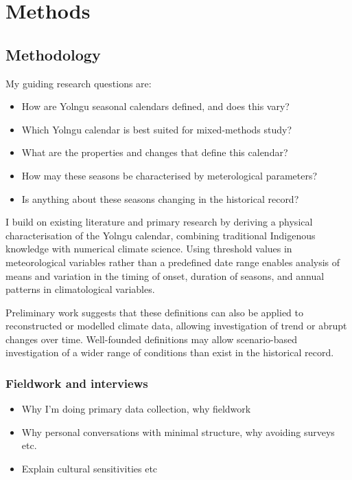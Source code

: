 \chapter{Methods}
\label{ch:methods}

\section{Methodology}

My guiding research questions are:
\begin{itemize}
\item How are Yolngu seasonal calendars defined, and does this vary?
\item Which Yolngu calendar is best suited for mixed-methods study?
\item What are the properties and changes that define this calendar?
\item How may these seasons be characterised by meterological parameters?
\item Is anything about these seasons changing in the historical record?
\end{itemize}

I build on existing literature and primary research by deriving a physical
characterisation of the Yolngu calendar, combining traditional Indigenous
knowledge with numerical climate science. Using threshold values in meteorological
variables rather than a predefined date range enables analysis of means and
variation in the timing of onset, duration of seasons, and annual patterns
in climatological variables.

Preliminary work suggests that these definitions can also be applied to
reconstructed or modelled climate data, allowing investigation of trend
or abrupt changes over time. Well-founded definitions may allow scenario-based
investigation of a wider range of conditions than exist in the historical record. 



\subsection{Fieldwork and interviews}

\begin{itemize}
\item Why I'm doing primary data collection, why fieldwork
\item Why personal conversations with minimal structure, why avoiding surveys etc.
\item Explain cultural sensitivities etc
\end{itemize}


